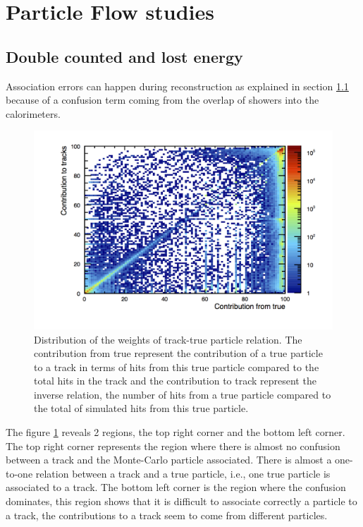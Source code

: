 \section{Particle Flow studies}

\subsection{Double counted and lost energy}

Association errors can happen during reconstruction as explained in section \ref{} because of a confusion term coming from the overlap of showers into the calorimeters.

\begin{figure}[htbp!]
  \centering
  \includegraphics[width=1\linewidth]{../Thesis_Plots/SGV/Plots/weight_corr.png}
  \caption{Distribution of the weights of track-true particle relation. The contribution from true represent the contribution of a true particle to a track in terms of hits from this true particle compared to the total hits in the track and the contribution to track represent the inverse relation, the number of hits from a true particle compared to the total of simulated hits from this true particle.}
  \label{fig:weight_tracks}
\end{figure}

The figure \ref{fig:weight_tracks} reveals 2 regions, the top right corner and the bottom left corner. The top right corner represents the region where there is almost no confusion between a track and the Monte-Carlo particle associated. There is almost a one-to-one relation between a track and a true particle, i.e., one true particle is associated to a track. The bottom left corner is the region where the confusion dominates, this region shows that it is difficult to associate correctly a particle to a track, the contributions to a track seem to come from different particles.

